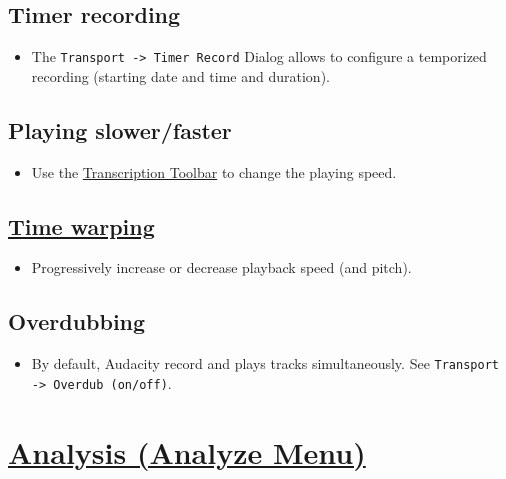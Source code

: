 \section{Timer recording}
\begin{itemize}
\item The \verb|Transport -> Timer Record| Dialog allows to configure
  a temporized recording (starting date and time and duration).
\end{itemize}

\section{Playing slower/faster}
\begin{itemize}
\item Use the
  \href{http://manual.audacityteam.org/o/man/transcription_toolbar.html}{Transcription
    Toolbar} to change the playing speed.
\end{itemize}

\section{\href{http://manual.audacityteam.org/o/man/time_tracks.html}{Time warping}}
\begin{itemize}
\item Progressively increase or decrease playback speed (and pitch).
\end{itemize}

\section{Overdubbing}
\label{sec:overdubbing}
\begin{itemize}
\item By default, Audacity record and plays tracks simultaneously. See %
  \verb|Transport -> Overdub (on/off)|.
\end{itemize}

\chapter{\href{http://manual.audacityteam.org/o/man/index_of_effects_generators_and_analyzers.html\#analyzers}{Analysis (Analyze Menu)}}

